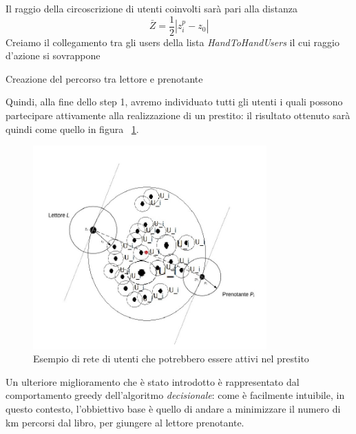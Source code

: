 \begin{itemize}
\begin{itemize}
\begin{algorithm}[H]
			
			Il raggio della circoscrizione di utenti coinvolti sarà pari alla distanza
			\[ \bar{Z} = \dfrac{1}{2} |z^{p}_{i}-z_{0}| \]
			Creiamo il collegamento tra gli users della lista \textit{HandToHandUsers} il cui raggio d'azione si sovrappone\;
			\caption{Creazione del percorso tra lettore e prenotante}
		\end{algorithm}
		
		Quindi, alla fine dello step 1, avremo individuato tutti gli utenti i quali possono partecipare attivamente alla realizzazione di un prestito: il risultato ottenuto sarà quindi come quello in figura ~\ref{fig:UsersNet}.
						
		\begin{figure}[h!]
			\centering
			\includegraphics[width=0.8\textwidth]{Immagini/Algorithm_UsersNet}
			\caption{Esempio di rete di utenti che potrebbero essere attivi nel prestito}
			\label{fig:UsersNet}
		\end{figure}
	\end{itemize}
\end{itemize}

Un ulteriore miglioramento che è stato introdotto è rappresentato dal comportamento greedy dell'algoritmo \textit{decisionale}: come è facilmente intuibile, in questo contesto, l'obbiettivo base è quello di andare a minimizzare il numero di km percorsi dal libro, per giungere al lettore prenotante.

